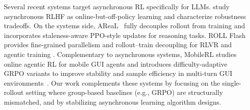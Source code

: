 Several recent systems target asynchronous RL specifically for LLMs. \citet{noukhovitch2024asynchronous} study asynchronous RLHF as online-but-off-policy learning and characterize robustness tradeoffs. On the systems side, AReaL~\citep{fu2025areal} fully decouples rollout from training and incorporates staleness-aware PPO-style updates for reasoning tasks. ROLL Flash provides fine-grained parallelism and rollout--train decoupling for RLVR and agentic training \citep{lu2025part}.
Complementary to asynchronous systems, MobileRL studies online agentic RL for mobile GUI agents and introduces difficulty-adaptive GRPO variants to improve stability and sample efficiency in multi-turn GUI environments~\citep{xu2025mobilerl}.
Our work complements these systems by focusing on the single-rollout setting where group-based baselines (e.g., GRPO) are structurally mismatched, and by stabilizing asynchronous learning algorithm designs.


